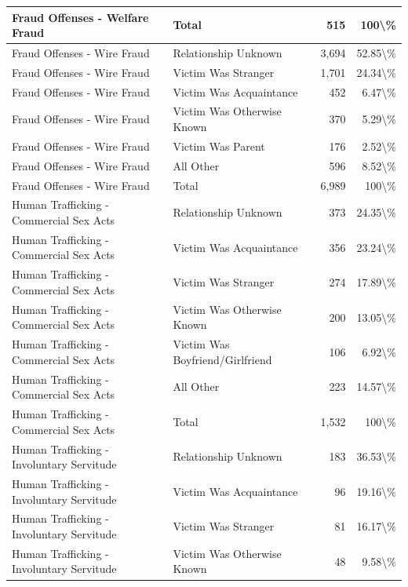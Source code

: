 \documentclass[
]{krantz}
\begin{document}
\begin{longtable}[t]{l|l|r|r}
\hline
Fraud Offenses - Welfare Fraud & Total & 515 & 100\textbackslash{}\%\\
\hline
Fraud Offenses - Wire Fraud & Relationship Unknown & 3,694 & 52.85\textbackslash{}\%\\
\hline
Fraud Offenses - Wire Fraud & Victim Was Stranger & 1,701 & 24.34\textbackslash{}\%\\
\hline
Fraud Offenses - Wire Fraud & Victim Was Acquaintance & 452 & 6.47\textbackslash{}\%\\
\hline
Fraud Offenses - Wire Fraud & Victim Was Otherwise Known & 370 & 5.29\textbackslash{}\%\\
\hline
Fraud Offenses - Wire Fraud & Victim Was Parent & 176 & 2.52\textbackslash{}\%\\
\hline
Fraud Offenses - Wire Fraud & All Other & 596 & 8.52\textbackslash{}\%\\
\hline
Fraud Offenses - Wire Fraud & Total & 6,989 & 100\textbackslash{}\%\\
\hline
Human Trafficking - Commercial Sex Acts & Relationship Unknown & 373 & 24.35\textbackslash{}\%\\
\hline
Human Trafficking - Commercial Sex Acts & Victim Was Acquaintance & 356 & 23.24\textbackslash{}\%\\
\hline
Human Trafficking - Commercial Sex Acts & Victim Was Stranger & 274 & 17.89\textbackslash{}\%\\
\hline
Human Trafficking - Commercial Sex Acts & Victim Was Otherwise Known & 200 & 13.05\textbackslash{}\%\\
\hline
Human Trafficking - Commercial Sex Acts & Victim Was Boyfriend/Girlfriend & 106 & 6.92\textbackslash{}\%\\
\hline
Human Trafficking - Commercial Sex Acts & All Other & 223 & 14.57\textbackslash{}\%\\
\hline
Human Trafficking - Commercial Sex Acts & Total & 1,532 & 100\textbackslash{}\%\\
\hline
Human Trafficking - Involuntary Servitude & Relationship Unknown & 183 & 36.53\textbackslash{}\%\\
\hline
Human Trafficking - Involuntary Servitude & Victim Was Acquaintance & 96 & 19.16\textbackslash{}\%\\
\hline
Human Trafficking - Involuntary Servitude & Victim Was Stranger & 81 & 16.17\textbackslash{}\%\\
\hline
Human Trafficking - Involuntary Servitude & Victim Was Otherwise Known & 48 & 9.58\textbackslash{}\%\\

\end{longtable}
\end{document}
